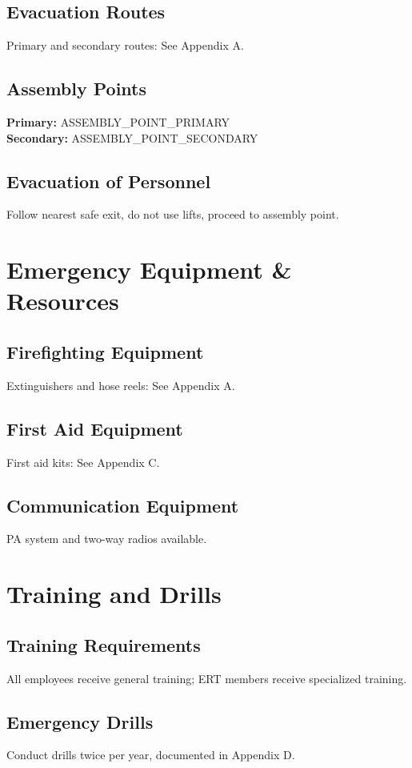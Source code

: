 \documentclass[11pt]{article}
\begin{document}
\subsection{Evacuation Routes}
Primary and secondary routes: See Appendix A.

\subsection{Assembly Points}
\textbf{Primary:} {{ASSEMBLY_POINT_PRIMARY}} \\
\textbf{Secondary:} {{ASSEMBLY_POINT_SECONDARY}}

\subsection{Evacuation of Personnel}
Follow nearest safe exit, do not use lifts, proceed to assembly point.

\section{Emergency Equipment \& Resources}

\subsection{Firefighting Equipment}
Extinguishers and hose reels: See Appendix A.

\subsection{First Aid Equipment}
First aid kits: See Appendix C.

\subsection{Communication Equipment}
PA system and two-way radios available.

\section{Training and Drills}

\subsection{Training Requirements}
All employees receive general training; ERT members receive specialized training.

\subsection{Emergency Drills}
Conduct drills twice per year, documented in Appendix D.
\end{document}
